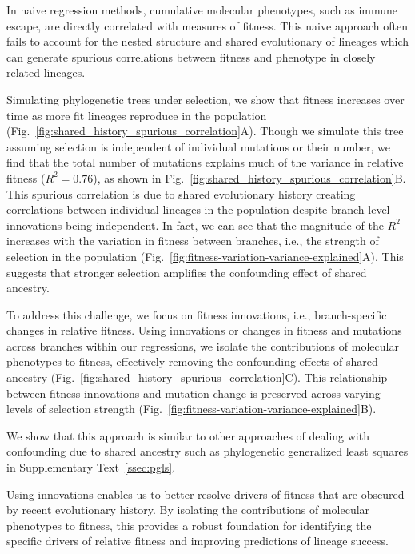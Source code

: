 In naive regression methods, cumulative molecular phenotypes, such as immune escape, are directly correlated with measures of fitness.
This naive approach often fails to account for the nested structure and shared evolutionary of lineages which can generate spurious correlations between fitness and phenotype in closely related lineages.

Simulating phylogenetic trees under selection, we show that fitness increases over time as more fit lineages reproduce in the population (Fig.~\ref{fig:shared_history_spurious_correlation}A).
Though we simulate this tree assuming selection is independent of individual mutations or their number, we find that the total number of mutations explains much of the variance in relative fitness ($R^2=0.76$), as shown in Fig.~\ref{fig:shared_history_spurious_correlation}B.
This spurious correlation is due to shared evolutionary history creating correlations between individual lineages in the population despite branch level innovations being independent.
In fact, we can see that the magnitude of the $R^2$ increases with the variation in fitness between branches, i.e., the strength of selection in the population (Fig.~\ref{fig:fitness-variation-variance-explained}A).
This suggests that stronger selection amplifies the confounding effect of shared ancestry.

To address this challenge, we focus on fitness innovations, i.e., branch-specific changes in relative fitness.
Using innovations or changes in fitness and mutations across branches within our regressions, we isolate the contributions of molecular phenotypes to fitness, effectively removing the confounding effects of shared ancestry (Fig.~\ref{fig:shared_history_spurious_correlation}C).
This relationship between fitness innovations and mutation change is preserved across varying levels of selection strength (Fig.~\ref{fig:fitness-variation-variance-explained}B).

We show that this approach is similar to other approaches of dealing with confounding due to shared ancestry such as phylogenetic generalized least squares in Supplementary Text~\ref{ssec:pgls}.

Using innovations enables us to better resolve drivers of fitness that are obscured by recent evolutionary history.
By isolating the contributions of molecular phenotypes to fitness, this provides a robust foundation for identifying the specific drivers of relative fitness and improving predictions of lineage success.

